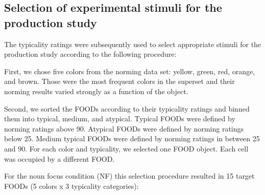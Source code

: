 \documentclass[
  12pt,
]{article}
\begin{document}
\hypertarget{selection-of-experimental-stimuli-for-the-production-study}{%
\subsection{Selection of experimental stimuli for the production study}\label{selection-of-experimental-stimuli-for-the-production-study}}

The typicality ratings were subsequently used to select appropriate stimuli for the production study according to the following procedure:

First, we chose five colors from the norming data set: yellow, green, red, orange, and brown.
Those were the most frequent colors in the superset and their norming results varied strongly as a function of the object.

Second, we sorted the FOODs according to their typicality ratings and binned them into typical, medium, and atypical.
Typical FOODs were defined by norming ratings above 90.
Atypical FOODs were defined by norming ratings below 25.
Medium typical FOODs were defined by norming ratings in between 25 and 90.
For each color and typicality, we selected one FOOD object.
Each cell was occupied by a different FOOD.

For the noun focus condition (NF) this selection procedure resulted in 15 target FOODs (5 colors x 3 typicality categories):
\end{document}

